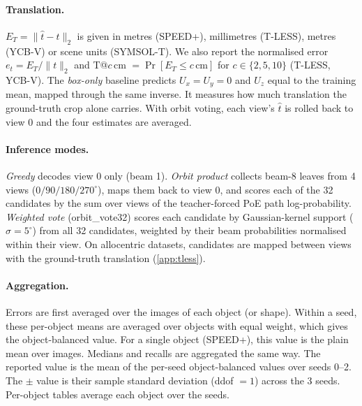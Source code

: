 \paragraph{Translation.}
$E_T=\|\hat t-t\|_2$ is given in metres (SPEED+), millimetres (T-LESS), metres (YCB-V) or scene units (SYMSOL-T). We also report the normalised error $e_t=E_T/\|t\|_2$ and T@$c$\,cm $=\Pr[E_T\le c\,\text{cm}]$ for $c\in\{2,5,10\}$ (T-LESS, YCB-V).
The \emph{box-only} baseline predicts $U_x=U_y=0$ and $U_z$ equal to the training mean, mapped through the same inverse. It measures how much translation the ground-truth crop alone carries.
With orbit voting, each view's $\hat t$ is rolled back to view 0 and the four estimates are averaged.

\paragraph{Inference modes.}
\emph{Greedy} decodes view 0 only (beam 1).
\emph{Orbit product} collects beam-8 leaves from 4 views ($0/90/180/270^\circ$), maps them back to view 0, and scores each of the 32 candidates by the sum over views of the teacher-forced PoE path log-probability.
\emph{Weighted vote} (orbit\_vote32) scores each candidate by Gaussian-kernel support ($\sigma=5^\circ$) from all 32 candidates, weighted by their beam probabilities normalised within their view.
On allocentric datasets, candidates are mapped between views with the ground-truth translation (\cref{app:tless}).

\paragraph{Aggregation.}
Errors are first averaged over the images of each object (or shape). Within a seed, these per-object means are averaged over objects with equal weight, which gives the object-balanced value. For a single object (SPEED+), this value is the plain mean over images. Medians and recalls are aggregated the same way.
The reported value is the mean of the per-seed object-balanced values over seeds 0--2. The $\pm$ value is their sample standard deviation (ddof $=1$) across the 3 seeds. Per-object tables average each object over the seeds.

